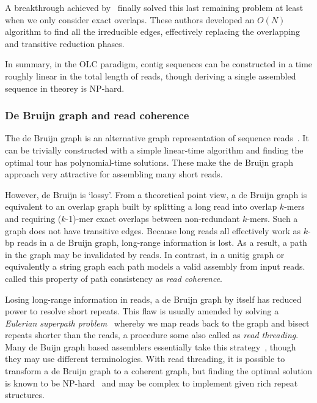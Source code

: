 \documentclass{bioinfo}
\begin{document}
\begin{methods}
A breakthrough achieved by~\citet{Simpson:2010uq} finally solved
this last remaining problem at least when we only consider exact overlaps.
These authors developed an $O(N)$ algorithm to find all the irreducible edges,
effectively replacing the overlapping and transitive reduction phases.

In summary, in the OLC paradigm, contig sequences can be constructed in a time
roughly linear in the total length of reads, though deriving a single assembled
sequence in theorey is NP-hard.

\subsubsection{De Bruijn graph and read coherence}
The de Bruijn graph is an alternative graph representation of sequence
reads~\citep{Idury:1995oq}.  It can be trivially constructed with a simple
linear-time algorithm and finding the optimal tour has polynomial-time
solutions. These make the de Bruijn graph approach very attractive for
assembling many short reads.

However, de Bruijn is `lossy'. From a theoretical point view, a de Bruijn graph
is equivalent to an overlap graph built by splitting a long read into overlap
$k$-mers and requiring ($k$-1)-mer exact overlaps between non-redundant
$k$-mers.  Such a graph does not have transitive edges. Because long reads all
effectively work as $k$-bp reads in a de Bruijn graph, long-range information
is lost. As a result, a path in the graph may be invalidated by reads. In
contrast, in a unitig graph or equivalently a string graph each path models a
valid assembly from input reads. \citet{Myers:2005bh} called this property of
path consistency as \emph{read coherence}.

Losing long-range information in reads, a de Bruijn graph by itself has
reduced power to resolve short repeats. This flaw is usually amended by solving
a \emph{Eulerian superpath problem}~\citep{Pevzner:2001vn} whereby we
map reads back to the graph and bisect repeats shorter than the reads, a
procedure some also called as \emph{read threading}. Many de Buijn graph based
assemblers essentially take this
strategy~\citep{Chaisson:2009fk,Zerbino:2009ly,Li:2010vn}, though they may use
different terminologies.  With read threading, it is possible to transform a de
Bruijn graph to a coherent graph, but finding the optimal solution is known to be
NP-hard~\citep{DBLP:conf/wabi/MedvedevGMB07} and may be complex to implement
given rich repeat structures.


\end{methods}
\end{document}
